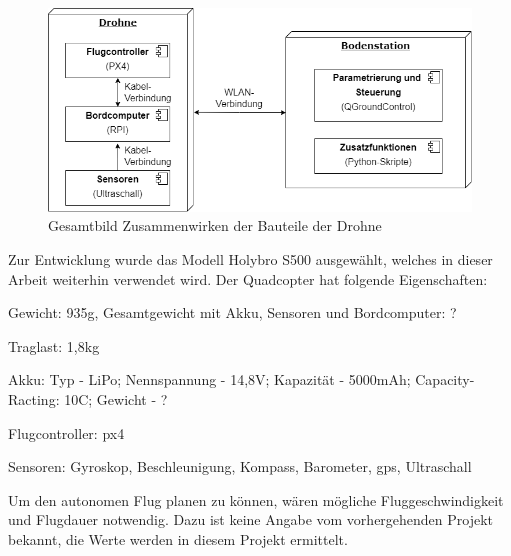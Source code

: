 \begin{figure}[!h]
	\includegraphics[width=\linewidth]{images/setup_initial_simple.drawio.png}
	\caption{Gesamtbild Zusammenwirken der Bauteile der Drohne}
	\label{fig:setup_initial}
	\end{figure}

Zur Entwicklung wurde das Modell Holybro S500 ausgewählt, welches in dieser Arbeit weiterhin verwendet wird. Der Quadcopter hat folgende Eigenschaften:
\begin{compactitem}
	\item Gewicht: 935g, Gesamtgewicht mit Akku, Sensoren und Bordcomputer: ?
	\item Traglast: 1,8kg
	\item Akku: Typ - LiPo; Nennspannung - 14,8V; Kapazität - 5000mAh; Capacity-Racting: 10C; Gewicht - ?
	\item Flugcontroller: \gls{px4}
	\item Sensoren: Gyroskop, Beschleunigung, Kompass, Barometer, \acrshort{gps}, Ultraschall
\end{compactitem}

Um den autonomen Flug planen zu können, wären mögliche Fluggeschwindigkeit und Flugdauer notwendig. Dazu ist keine Angabe vom vorhergehenden Projekt bekannt, die Werte werden in diesem Projekt ermittelt.


